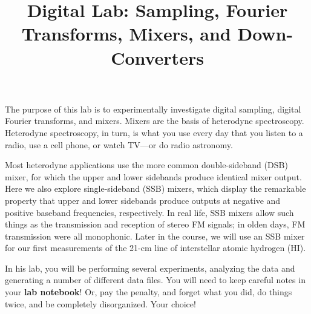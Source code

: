 \documentclass[11pt]{article}
\begin{document}
\title{Digital Lab: Sampling, Fourier Transforms, Mixers, and Down-Converters}

\maketitle

    The purpose of this lab is to experimentally investigate digital
sampling, digital Fourier transforms, and mixers. Mixers are the basis
of heterodyne spectroscopy. Heterodyne spectroscopy, in turn, is what
you use every day that you listen to a radio, use a cell phone, or watch
TV---or do radio astronomy.  

Most heterodyne applications use the more common double-sideband (DSB)
mixer, for which the upper and lower sidebands produce identical mixer
output. Here we also explore single-sideband (SSB) mixers, which display
the remarkable property that upper and lower sidebands produce outputs
at negative and positive baseband frequencies, respectively. In real
life, SSB mixers allow such things as the transmission and reception of
stereo FM signals; in olden days, FM transmission were all monophonic.
Later in the course, we will use an SSB mixer for our first measurements
of the 21-cm line of interstellar atomic hydrogen (HI). 

In his lab, you will be performing several experiments, analyzing the
data and generating a number of different data files. You will need to
keep careful notes in your {\bf lab notebook}! Or, pay the penalty, and
forget what you did, do things twice, and be completely
disorganized. Your choice!
\end{document}
